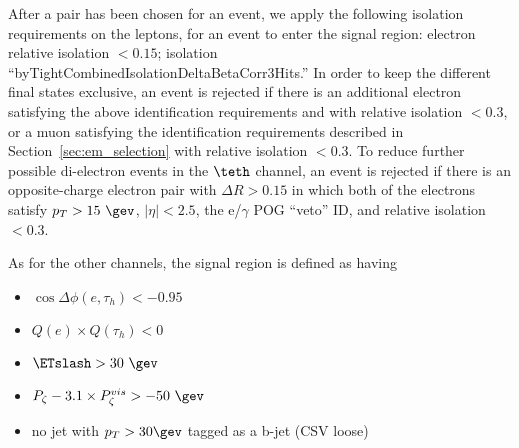 
After a pair has been chosen for an event, we apply the following
isolation requirements on the leptons, for an event to enter the
signal region: electron relative isolation $<0.15$; \tauh isolation
``byTightCombinedIsolationDeltaBetaCorr3Hits.''  In order to keep the
different final states exclusive, an event is rejected if there is an
additional electron satisfying the above identification requirements
and with relative isolation $<0.3$, or a muon satisfying the
identification requirements described in
Section~\ref{sec:em_selection} with relative isolation $<0.3$.  To
reduce further possible di-electron events in the $\teth$ channel, an
event is rejected if there is an opposite-charge electron pair with
$\Delta R > 0.15$ in which both of the electrons satisfy $p_T >
15~\gev$, $\vert \eta \vert < 2.5$, the e/$\gamma$ POG ``veto'' ID,
and relative isolation $<0.3$.

As for the other channels, the signal region is defined as having
\begin{itemize}
  \item $\cos{\Delta \phi (e,\tau_{h})}<-0.95$
  \item $Q(e) \times Q(\tau_{h}) < 0 $
  \item $\ETslash>30~\gev$
  \item $P_{\zeta}- 3.1 \times P_{\zeta}^{vis} > -50~\gev$
  \item no jet with $p_T>30\gev$ tagged as a b-jet (CSV loose)
\end{itemize}

